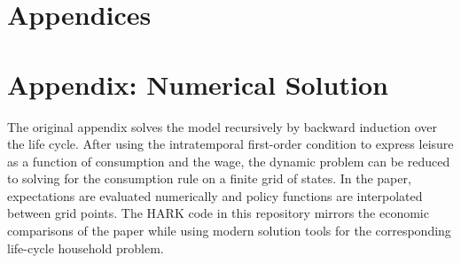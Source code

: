 \documentclass[titlepage, headings=optiontotocandhead]{econark} %
\begin{document}
\pagebreak

\clearpage
\section*{Appendices}

\appendix
\section{Appendix: Numerical Solution}
The original appendix solves the model recursively by backward induction over the life cycle.
After using the intratemporal first-order condition to express leisure as a function of
consumption and the wage, the dynamic problem can be reduced to solving for the
consumption rule on a finite grid of states. In the paper, expectations are evaluated
numerically and policy functions are interpolated between grid points. The HARK code in
this repository mirrors the economic comparisons of the paper while using modern solution
tools for the corresponding life-cycle household problem.
\end{document}
